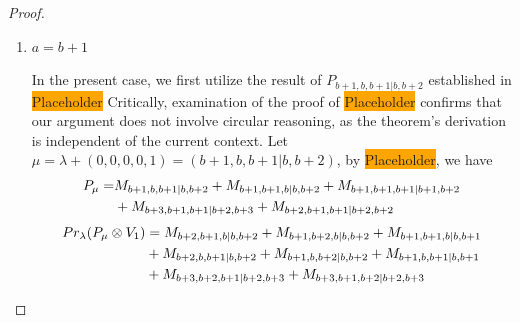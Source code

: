 \begin{proof}
\begin{enumerate}
\begin{enumerate}
\begin{table}[htbp]
\begin{tabular}{cc}
 $P_{a,a+1,b+1|b+1,a+1}$ & \makecell{
 $M_{a,a+2,b+1|b+1,a+2}$,
 $M_{a,a+1,b+2|b+2,a+1}$,
 $M_{a,a+2,b+2|b+2,a+2}$,
 $M_{a+1,a,b+1|b+1,a+1}$, \\
 $M_{a+2,a,b+1|b+1,a+2}$,
 $M_{a+1,a,b+2|b+2,a+1}$,
 $M_{a+2,a,b+2|b+2,a+2}$
}\\
 & \\
 $P_{a,b+1,a+1|b+1,a+1}$ & \makecell{
 $M_{a,b+2,a+1|b+2,a+1}$,
 $M_{a,b+1,a+2|b+1,a+2}$,
 $M_{a+1,b+1,a|b+1,a+1}$,
 $M_{a+1,a,b+1|b+1,a+1}$, \\
 $M_{a+1,b+2,a|b+2,a+1}$,
 $M_{a,a+1,b+2|b+2,a+1}$,
 $M_{a+1,a,b+2|b+2,a+1}$,
 $M_{a+2,b+1,a|b+1,a+2}$, \\
 $M_{a,a+2,b+1|b+1,a+2}$,
 $M_{a+2,a,b+1|b+1,a+2}$
}\\
\bottomrule
\end{tabular}
\vspace{0.5em}
\parbox{\linewidth}{\small
\textbf{Interpretation:}
This table displays only selected computational results. This partial presentation does not affect our conclusion.
}
\end{table}
      \item $a=b+1$ \par
        In the present case, we first utilize the result of $P_{b+1,b,b+1|b,b+2}$ established in \colorbox{orange}{Placeholder} Critically, examination of the proof of \colorbox{orange}{Placeholder} confirms that our argument does not involve circular reasoning, as the theorem's derivation is independent of the current context. Let $\mu = \lambda + (0,0,0,0,1) =(b+1,b,b+1|b,b+2) $, by \colorbox{orange}{Placeholder}, we have
\begin{equation}\notag
  \begin{aligned}
    P_{\mu} =& M_{b+1,b,b+1|b,b+2}
+M_{b+1,b+1,b|b,b+2}
+M_{b+1,b+1,b+1|b+1,b+2} \\
            &+M_{b+3,b+1,b+1|b+2,b+3}
+M_{b+2,b+1,b+1|b+2,b+2}
  \end{aligned}
\end{equation}
        \begin{equation}\notag
          \begin{aligned}
            Pr_{\lambda}(P_\mu \otimes V_{1}) &=
M_{b+2,b+1,b|b,b+2}
+ M_{b+1,b+2,b|b,b+2}
+ M_{b+1,b+1,b|b,b+1}\\
                                            &
+ M_{b+2,b,b+1|b,b+2}
+ M_{b+1,b,b+2|b,b+2}
+ M_{b+1,b,b+1|b,b+1}\\
                                            &
+ M_{b+3,b+2,b+1|b+2,b+3}
+ M_{b+3,b+1,b+2|b+2,b+3}

\end{aligned}
\end{equation}
\end{enumerate}
\end{enumerate}
\end{proof}
